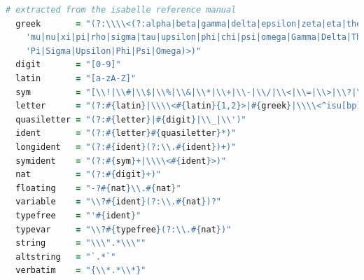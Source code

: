 \begin{lstlisting}[language=coffee]
  # extracted from the isabelle reference manual
  greek       = "(?:\\\\<(?:alpha|beta|gamma|delta|epsilon|zeta|eta|theta|iota|kappa|' +
    'mu|nu|xi|pi|rho|sigma|tau|upsilon|phi|chi|psi|omega|Gamma|Delta|Theta|Lambda|Xi|' +
    'Pi|Sigma|Upsilon|Phi|Psi|Omega)>)"
  digit       = "[0-9]"
  latin       = "[a-zA-Z]"
  sym         = "[\\!|\\#|\\$|\\%|\\&|\\*|\\+|\\-|\\/|\\<|\\=|\\>|\\?|\\@|\\^|\\_|\\||\\~]"
  letter      = "(?:#{latin}|\\\\<#{latin}{1,2}>|#{greek}|\\\\<^isu[bp]>)"
  quasiletter = "(?:#{letter}|#{digit}|\\_|\\')"
  ident       = "(?:#{letter}#{quasiletter}*)"
  longident   = "(?:#{ident}(?:\\.#{ident})+)"
  symident    = "(?:#{sym}+|\\\\<#{ident}>)"
  nat         = "(?:#{digit}+)"
  floating    = "-?#{nat}\\.#{nat}"  
  variable    = "\\?#{ident}(?:\\.#{nat})?"
  typefree    = "'#{ident}"
  typevar     = "\\?#{typefree}(?:\\.#{nat})"
  string      = "\\\".*\\\""
  altstring   = "`.*`"
  verbatim    = "{\\*.*\\*}"
\end{lstlisting}

